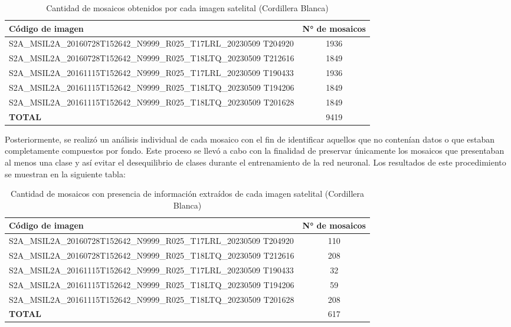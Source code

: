 \documentclass[12pt]{report}
\begin{document}
\begin{table}[H]
   \centering
   \caption{Cantidad de mosaicos obtenidos por cada imagen satelital (Cordillera Blanca)}
   \begin{tabularx}{1\textwidth}{Xc} 
\hline
\textbf{Código de imagen} & \textbf{N° de mosaicos} \\
\hline
S2A\_MSIL2A\_20160728T152642\_N9999\_R025\_T17LRL\_20230509
T204920 & 1936 \\
S2A\_MSIL2A\_20160728T152642\_N9999\_R025\_T18LTQ\_20230509
T212616 & 1849 \\
S2A\_MSIL2A\_20161115T152642\_N9999\_R025\_T17LRL\_20230509
T190433 & 1936 \\
S2A\_MSIL2A\_20161115T152642\_N9999\_R025\_T18LTQ\_20230509
T194206 & 1849 \\
S2A\_MSIL2A\_20161115T152642\_N9999\_R025\_T18LTQ\_20230509
T201628 & 1849 \\
\hline
\textbf{TOTAL} & 9419 \\
\hline
\end{tabularx}
   \label{tab:tiles_desde_imagenes}
\end{table}

Posteriormente, se realizó un análisis individual de cada mosaico con el fin de identificar aquellos que no contenían datos o que estaban completamente compuestos por fondo. Este proceso se llevó a cabo con la finalidad de preservar únicamente los mosaicos que presentaban al menos una clase y así evitar el desequilibrio de clases durante el entrenamiento de la red neuronal. Los resultados de este procedimiento se muestran en la siguiente tabla:

\begin{table}[H]
   \centering
   \caption{Cantidad de mosaicos con presencia de información extraídos de cada imagen satelital (Cordillera Blanca)}
   \begin{tabularx}{1\textwidth}{Xc} 
\hline
\textbf{Código de imagen} & \textbf{N° de mosaicos} \\
\hline
S2A\_MSIL2A\_20160728T152642\_N9999\_R025\_T17LRL\_20230509
T204920 & 110 \\
S2A\_MSIL2A\_20160728T152642\_N9999\_R025\_T18LTQ\_20230509
T212616 & 208 \\
S2A\_MSIL2A\_20161115T152642\_N9999\_R025\_T17LRL\_20230509
T190433 & 32 \\
S2A\_MSIL2A\_20161115T152642\_N9999\_R025\_T18LTQ\_20230509
T194206 & 59 \\
S2A\_MSIL2A\_20161115T152642\_N9999\_R025\_T18LTQ\_20230509
T201628 & 208 \\
\hline
\textbf{TOTAL} & 617 \\
\hline
\end{tabularx}
   \label{tab:tiles_desde_imagenes_con_datos}
\end{table}
\end{document}

